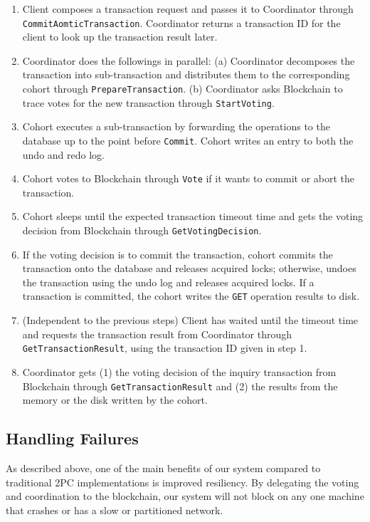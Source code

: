 \documentclass[11pt,conference]{IEEEtran}
\begin{document}
\begin{enumerate}
\item Client composes a transaction request and passes it to Coordinator through \texttt{\\CommitAomticTransaction}. Coordinator returns a transaction ID for the client to look up the transaction result later.
\item Coordinator does the followings in parallel: (a) Coordinator decomposes the transaction into sub-transaction and distributes them to the corresponding cohort through \texttt{PrepareTransaction}. (b) Coordinator asks Blockchain to trace votes for the new transaction through \texttt{StartVoting}.
\item Cohort executes a sub-transaction by forwarding the operations to the database up to the point before \texttt{Commit}. Cohort writes an entry to both the undo and redo log.
\item Cohort votes to Blockchain through \texttt{Vote} if it wants to commit or abort the transaction.
\item Cohort sleeps until the expected transaction timeout time and gets the voting decision from Blockchain through \texttt{GetVotingDecision}.
\item If the voting decision is to commit the transaction, cohort commits the transaction onto the database and releases acquired locks; otherwise, undoes the transaction using the undo log and releases acquired locks. If a transaction is committed, the cohort writes the \texttt{GET} operation results to disk.
\item (Independent to the previous steps) Client has waited until the timeout time and requests the transaction result from Coordinator through \texttt{GetTransactionResult}, using the transaction ID given in step 1.
\item Coordinator gets (1) the voting decision of the inquiry transaction from Blockchain through \texttt{GetTransactionResult} and (2) the results from the memory or the disk written by the cohort.
\end{enumerate}

\subsection{Handling Failures} \label{failurecases}
As described above, one of the main benefits of our system compared to traditional 2PC implementations is improved resiliency. By delegating the voting and coordination to the blockchain, our system will not block on any one machine that crashes or has a slow or partitioned network.
\end{document}
